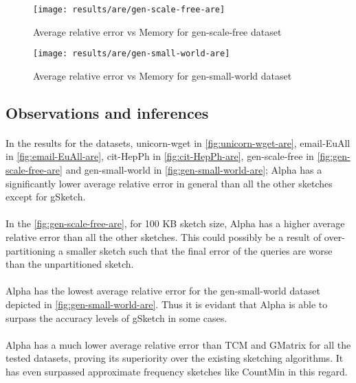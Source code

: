 \begin{figure}[H]
    \centering \texttt{[image: results/are/gen-scale-free-are]}
    \vspace{-0.5cm}
    \caption{Average relative error vs Memory for gen-scale-free dataset}
    \label{fig:gen-scale-free-are}
\end{figure}

\begin{figure}[H]
    \centering \texttt{[image: results/are/gen-small-world-are]}
    \vspace{-0.5cm}
    \caption{Average relative error vs Memory for gen-small-world dataset}
    \label{fig:gen-small-world-are}
\end{figure}

\subsection*{Observations and inferences}

\paragraph{}
In the results for the datasets, unicorn-wget in \autoref{fig:unicorn-wget-are}, email-EuAll in \autoref{fig:email-EuAll-are}, cit-HepPh in \autoref{fig:cit-HepPh-are}, gen-scale-free in \autoref{fig:gen-scale-free-are} and gen-small-world in \autoref{fig:gen-small-world-are}; Alpha has a significantly lower average relative error in general than all the other sketches except for gSketch.

\paragraph{}
In the \autoref{fig:gen-scale-free-are}, for 100 KB sketch size, Alpha has a higher average relative error than all the other sketches. This could possibly be a result of over-partitioning a smaller sketch such that the final error of the queries are worse than the unpartitioned sketch.

\paragraph{}
Alpha has the lowest average relative error for the gen-small-world dataset depicted in \autoref{fig:gen-small-world-are}. Thus it is evidant that Alpha is able to surpass the accuracy levels of gSketch in some cases.

\paragraph{}
Alpha has a much lower average relative error than TCM and GMatrix for all the tested datasets, proving its superiority over the existing sketching algorithms. It has even surpassed approximate frequency sketches like CountMin in this regard.